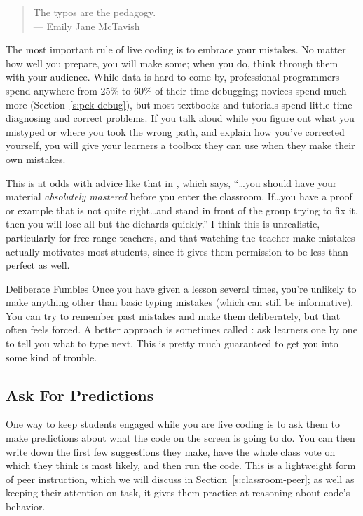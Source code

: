 \begin{quote}

  The typos are the pedagogy. \\
  --- Emily Jane McTavish

\end{quote}

The most important rule of live coding is to embrace your mistakes.
No matter how well you prepare,
you will make some;
when you do,
think through them with your audience.
While data is hard to come by,
professional programmers spend anywhere from 25\% to 60\% of their time debugging;
novices spend much more (Section~\ref{s:pck-debug}),
but most textbooks and tutorials spend little time diagnosing and correct problems.
If you talk aloud while you figure out what you mistyped
or where you took the wrong path,
and explain how you've corrected yourself,
you will give your learners a toolbox they can use when they make their own mistakes.

This is at odds with advice like that in \cite{Kran2015},
which says,
``{\ldots}you should have your material \emph{absolutely mastered} before you enter the classroom.
If{\ldots}you have a proof or example that is not quite right{\ldots}and stand in front of the group trying to fix it,
then you will lose all but the diehards quickly.''
I think this is unrealistic,
particularly for free-range teachers,
and that watching the teacher make mistakes actually motivates most students,
since it gives them permission to be less than perfect as well.

\begin{aside}{Deliberate Fumbles}
  Once you have given a lesson several times,
  you're unlikely to make anything other than basic typing mistakes
  (which can still be informative).
  You can try to remember past mistakes and make them deliberately,
  but that often feels forced.
  A better approach is sometimes called :
  ask learners one by one to tell you what to type next.
  This is pretty much guaranteed to get you into some kind of trouble.
\end{aside}

\subsection*{Ask For Predictions}

One way to keep students engaged while you are live coding
is to ask them to make predictions about what the code on the screen is going to do.
You can then write down the first few suggestions they make,
have the whole class vote on which they think is most likely,
and then run the code.
This is a lightweight form of peer instruction,
which we will discuss in Section~\ref{s:classroom-peer};
as well as keeping their attention on task,
it gives them practice at reasoning about code's behavior.


